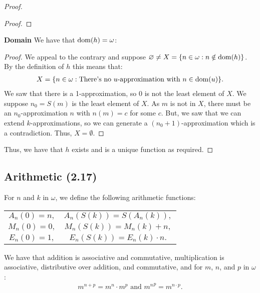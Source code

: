 \begin{proof}
\begin{proof}
    \end{proof}
    \noindent
    \textbf{Domain} 
    We have that $\operatorname{dom}(h) = \omega$: \begin{proof}
        We appeal to the contrary and
        suppose $\varnothing \neq X = \{n \in \omega : n \notin \operatorname{dom}(h)\}$.
        By the definition of $h$ this means that: \begin{align*}
            X = \{n \in \omega : \text{There's no } u\text{-approximation with }
                n \in \operatorname{dom}(u)\}.
        \end{align*} We saw that there is a 1-approximation, so 0 is not
        the least element of $X$. We suppose $n_0 = S(m)$ is the least
        element of $X$. As $m$ is not in $X$, there must be an $n_0$-approximation
        $n$ with $n(m) = c$ for some $c$. But, we saw that we can extend
        $k$-approximations, so we can generate a $(n_0 + 1)$-approximation
        which is a contradiction.
        Thus, $X = \emptyset$.
    \end{proof} 
    \noindent
    Thus, we have that $h$ exists and is a unique function as required.
\end{proof} 

\subsection{Arithmetic (2.17)} \label{2.17}

For $n$ and $k$ in $\omega$, we define the following arithmetic functions: 
\begin{center}
    \begin{tabular}{c c}
        $A_n(0) = n,$ & $A_n(S(k)) = S(A_n(k)),$ \\
        $M_n(0) = 0,$ & $M_n(S(k)) = M_n(k) + n,$\\
        $E_n(0) = 1,$ & $E_n(S(k)) = E_n(k) \cdot n.$
    \end{tabular}
\end{center} We have that addition is associative and commutative,
multiplication is associative, distributive over addition, and
commutative, and for $m$, $n$, and $p$ in $\omega$: \begin{align*}
    m^{n + p} = m^n \cdot m^p \text{ and }
    {m^n}^p = m^{n \cdot p}.
\end{align*}
